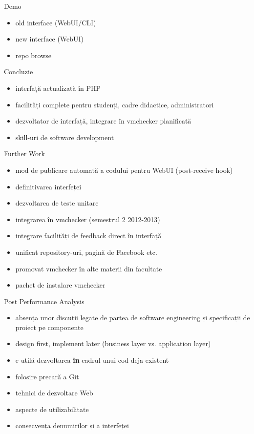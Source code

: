\documentclass{beamer}
\begin{document}
\begin{frame}{Demo}
  \begin{itemize}
    \item old interface (WebUI/CLI)
    \item new interface (WebUI)
    \item repo browse
  \end{itemize}
\end{frame}

\begin{frame}{Concluzie}
  \begin{itemize}
    \item interfață actualizată în PHP
    \item facilități complete pentru studenți, cadre didactice, administratori
    \item dezvoltator de interfață, integrare în vmchecker planificată
    \item skill-uri de software development
  \end{itemize}
\end{frame}

\begin{frame}{Further Work}
  \begin{itemize}
    \item mod de publicare automată a codului pentru WebUI (post-receive hook)
    \item definitivarea interfeței
    \item dezvoltarea de teste unitare
    \item integrarea în vmchecker (semestrul 2 2012-2013)
    \item integrare facilități de feedback direct în interfață
    \item unificat repository-uri, pagină de Facebook etc.
    \item promovat vmchecker în alte materii din facultate
    \item pachet de instalare vmchecker
  \end{itemize}
\end{frame}

\begin{frame}{Post Performance Analysis}
  \begin{itemize}
    \item absența unor discuții legate de partea de software engineering și
      specificații de proiect pe componente
    \item design first, implement later (business layer vs. application layer)
    \item e utilă dezvoltarea \textbf{în} cadrul unui cod deja existent
    \item folosire precară a Git
    \item tehnici de dezvoltare Web
    \item aspecte de utilizabilitate
    \item consecvența denumirilor și a interfeței
  \end{itemize}
\end{frame}
\end{document}
